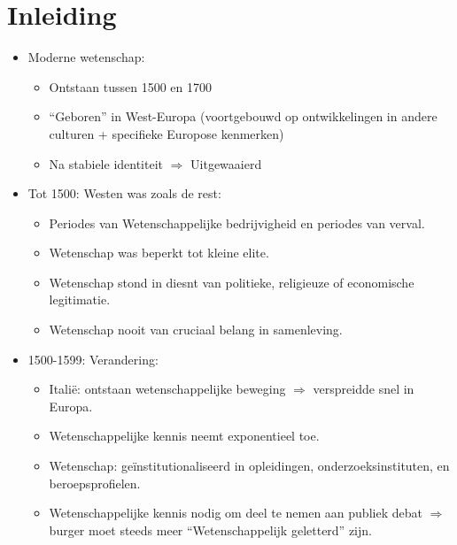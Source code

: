 \documentclass{article}
\begin{document}
  \section*{Inleiding}
    \begin{itemize}
      \item Moderne wetenschap:
      \begin{itemize}
        \item Ontstaan tussen 1500 en 1700
        \item ``Geboren'' in West-Europa (voortgebouwd op ontwikkelingen in andere culturen + specifieke Europose kenmerken)
        \item Na stabiele identiteit $\Rightarrow$ Uitgewaaierd
      \end{itemize}

      \item Tot 1500: Westen was zoals de rest:
      \begin{itemize}
        \item Periodes van Wetenschappelijke bedrijvigheid en periodes van verval.
        \item Wetenschap was beperkt tot kleine elite.
        \item Wetenschap stond in diesnt van politieke, religieuze of economische legitimatie.
        \item Wetenschap nooit van cruciaal belang in samenleving.
      \end{itemize}

      \item 1500-1599: Verandering:
      \begin{itemize}
        \item Itali\"e: ontstaan wetenschappelijke beweging $\Rightarrow$ verspreidde snel in Europa.
        \item Wetenschappelijke kennis neemt exponentieel toe.
        \item Wetenschap: ge\"institutionaliseerd in opleidingen, onderzoeksinstituten, en beroepsprofielen.
        \item Wetenschappelijke kennis nodig om deel te nemen aan publiek debat $\Rightarrow$ burger moet steeds meer ``Wetenschappelijk geletterd'' zijn.
      \end{itemize}


\end{itemize}
\end{document}
